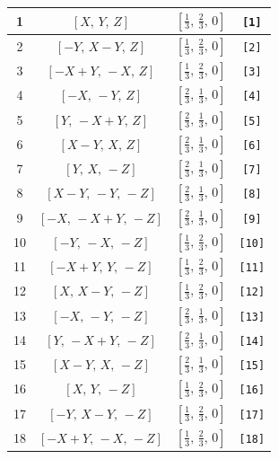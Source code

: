 \documentclass[fleqn,8pt]{jsarticle}
\begin{document}
\begin{longtable}{cccc}
1 & $\left[ X,\, Y,\, Z \right]$ & $\left[ \frac{1}{3},\, \frac{2}{3},\, 0 \right]$ & {\tt [1]} \\ \hline
2 & $\left[ - Y,\, X - Y,\, Z \right]$ & $\left[ \frac{1}{3},\, \frac{2}{3},\, 0 \right]$ & {\tt [2]} \\ \hline
3 & $\left[ - X + Y,\, - X,\, Z \right]$ & $\left[ \frac{1}{3},\, \frac{2}{3},\, 0 \right]$ & {\tt [3]} \\ \hline
4 & $\left[ - X,\, - Y,\, Z \right]$ & $\left[ \frac{2}{3},\, \frac{1}{3},\, 0 \right]$ & {\tt [4]} \\ \hline
5 & $\left[ Y,\, - X + Y,\, Z \right]$ & $\left[ \frac{2}{3},\, \frac{1}{3},\, 0 \right]$ & {\tt [5]} \\ \hline
6 & $\left[ X - Y,\, X,\, Z \right]$ & $\left[ \frac{2}{3},\, \frac{1}{3},\, 0 \right]$ & {\tt [6]} \\ \hline
7 & $\left[ Y,\, X,\, - Z \right]$ & $\left[ \frac{2}{3},\, \frac{1}{3},\, 0 \right]$ & {\tt [7]} \\ \hline
8 & $\left[ X - Y,\, - Y,\, - Z \right]$ & $\left[ \frac{2}{3},\, \frac{1}{3},\, 0 \right]$ & {\tt [8]} \\ \hline
9 & $\left[ - X,\, - X + Y,\, - Z \right]$ & $\left[ \frac{2}{3},\, \frac{1}{3},\, 0 \right]$ & {\tt [9]} \\ \hline
10 & $\left[ - Y,\, - X,\, - Z \right]$ & $\left[ \frac{1}{3},\, \frac{2}{3},\, 0 \right]$ & {\tt [10]} \\ \hline
11 & $\left[ - X + Y,\, Y,\, - Z \right]$ & $\left[ \frac{1}{3},\, \frac{2}{3},\, 0 \right]$ & {\tt [11]} \\ \hline
12 & $\left[ X,\, X - Y,\, - Z \right]$ & $\left[ \frac{1}{3},\, \frac{2}{3},\, 0 \right]$ & {\tt [12]} \\ \hline
13 & $\left[ - X,\, - Y,\, - Z \right]$ & $\left[ \frac{2}{3},\, \frac{1}{3},\, 0 \right]$ & {\tt [13]} \\ \hline
14 & $\left[ Y,\, - X + Y,\, - Z \right]$ & $\left[ \frac{2}{3},\, \frac{1}{3},\, 0 \right]$ & {\tt [14]} \\ \hline
15 & $\left[ X - Y,\, X,\, - Z \right]$ & $\left[ \frac{2}{3},\, \frac{1}{3},\, 0 \right]$ & {\tt [15]} \\ \hline
16 & $\left[ X,\, Y,\, - Z \right]$ & $\left[ \frac{1}{3},\, \frac{2}{3},\, 0 \right]$ & {\tt [16]} \\ \hline
17 & $\left[ - Y,\, X - Y,\, - Z \right]$ & $\left[ \frac{1}{3},\, \frac{2}{3},\, 0 \right]$ & {\tt [17]} \\ \hline
18 & $\left[ - X + Y,\, - X,\, - Z \right]$ & $\left[ \frac{1}{3},\, \frac{2}{3},\, 0 \right]$ & {\tt [18]} \\ \hline

\end{longtable}
\end{document}
